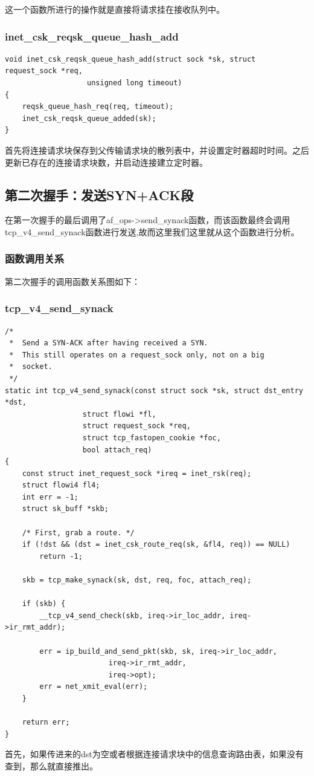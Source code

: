 \documentclass[11pt, a4paper,oneside]{book}
\theoremstyle{ocrenumbox}
\theoremstyle{purplenumbox}
\theoremstyle{blackbox}
\begin{document}
				这一个函数所进行的操作就是直接将请求挂在接收队列中。

			\subsubsection{inet\_csk\_reqsk\_queue\_hash\_add}

\begin{verbatim}
void inet_csk_reqsk_queue_hash_add(struct sock *sk, struct request_sock *req,
				   unsigned long timeout)
{
	reqsk_queue_hash_req(req, timeout);
	inet_csk_reqsk_queue_added(sk);
}
\end{verbatim}

				首先将连接请求块保存到父传输请求块的散列表中，并设置定时器超时时间。之后更新已存在的连接请求块数，并启动连接建立定时器。

        \subsection{第二次握手：发送SYN+ACK段}
			在第一次握手的最后调用了af\_ops->send\_synack函数，而该函数最终会调用tcp\_v4\_send\_synack函数进行发送,故而这里我们这里就从这个函数进行分析。
			\subsubsection{函数调用关系}			
				第二次握手的调用函数关系图如下：
			\subsubsection{tcp\_v4\_send\_synack}
\begin{verbatim}
/*
 *	Send a SYN-ACK after having received a SYN.
 *	This still operates on a request_sock only, not on a big
 *	socket.
 */
static int tcp_v4_send_synack(const struct sock *sk, struct dst_entry *dst,
			      struct flowi *fl,
			      struct request_sock *req,
			      struct tcp_fastopen_cookie *foc,
				  bool attach_req)
{
	const struct inet_request_sock *ireq = inet_rsk(req);
	struct flowi4 fl4;
	int err = -1;
	struct sk_buff *skb;

	/* First, grab a route. */
	if (!dst && (dst = inet_csk_route_req(sk, &fl4, req)) == NULL)
		return -1;

	skb = tcp_make_synack(sk, dst, req, foc, attach_req);

	if (skb) {
		__tcp_v4_send_check(skb, ireq->ir_loc_addr, ireq->ir_rmt_addr);

		err = ip_build_and_send_pkt(skb, sk, ireq->ir_loc_addr,
					    ireq->ir_rmt_addr,
					    ireq->opt);
		err = net_xmit_eval(err);
	}

	return err;
}
\end{verbatim}				
				首先，如果传进来的dst为空或者根据连接请求块中的信息查询路由表，如果没有查到，那么就直接推出。
\end{document}
